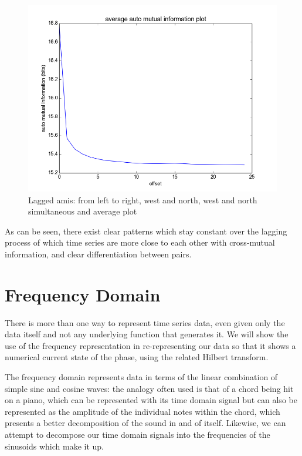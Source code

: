 \documentclass[12pt]{article}
\begin{document}
\begin{figure}
\begin{center}
    \includegraphics[scale=0.4]{norths_ami_summary}
  \end{center}
  \caption{Lagged amis: from left to right, west and north, west and north simultaneous and average plot}
\end{figure}

As can be seen, there exist clear patterns which stay constant over the lagging process of which time series are more close to each other with cross-mutual information, and clear differentiation between pairs.

\section{Frequency Domain}

There is more than one way to represent time series data, even given only the data itself and not any underlying function that generates it. We will show the use of the frequency representation in re-representing our data so that it shows a numerical current state of the phase, using the related Hilbert transform.

The frequency domain represents data in terms of the linear combination of simple sine and cosine waves: the analogy often used is that of a chord being hit on a piano, which can be represented with its time domain signal but can also be represented as the amplitude of the individual notes within the chord, which presents a better decomposition of the sound in and of itself. Likewise, we can attempt to decompose our time domain signals into the frequencies of the sinusoids which make it up.
\end{document}
